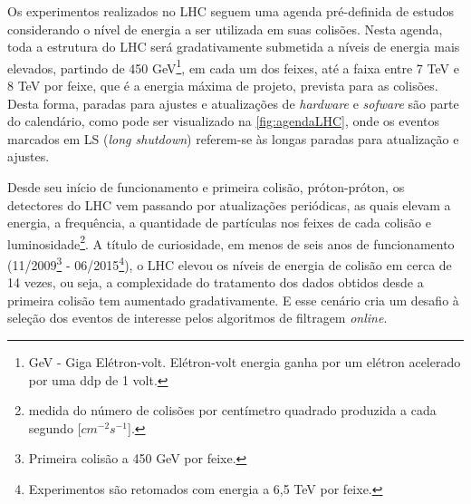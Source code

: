 Os experimentos realizados no LHC seguem uma agenda pré-definida de estudos considerando o nível de energia a ser utilizada em suas colisões. Nesta agenda, toda a estrutura do LHC será gradativamente submetida a níveis de energia mais elevados, partindo de 450 GeV\footnote{GeV - Giga Elétron-volt. Elétron-volt energia ganha por um elétron acelerado por uma ddp de 1 volt.}, em cada um dos feixes, até a faixa entre 7 TeV e 8 TeV por feixe, que é a energia máxima de projeto, prevista para as colisões. Desta forma, paradas para ajustes e atualizações de \textit{hardware} e \textit{sofware} são parte do calendário, como pode ser visualizado na \autoref{fig:agendaLHC}, onde os eventos marcados em LS (\textit{long shutdown}) referem-se às longas paradas para atualização e ajustes.


Desde seu início de funcionamento e primeira colisão, próton-próton, os detectores do LHC vem passando por atualizações periódicas, as quais elevam a energia, a frequência, a quantidade de partículas nos feixes de cada colisão \cite{timelines2016} e luminosidade\footnote{medida do número de colisões por centímetro quadrado produzida a cada segundo [$cm^{-2}s^{-1}$].}. A título de curiosidade, em menos de seis anos de funcionamento (11/2009\footnote{Primeira colisão a 450 GeV por feixe.} - 06/2015\footnote{Experimentos são retomados com energia a 6,5 TeV por feixe.}), o LHC elevou os níveis de energia de colisão em cerca de 14 vezes, ou seja, a complexidade do tratamento dos dados obtidos desde a primeira colisão tem aumentado gradativamente. E esse cenário cria um desafio à seleção dos eventos de interesse pelos algoritmos de filtragem \textit{online}.

